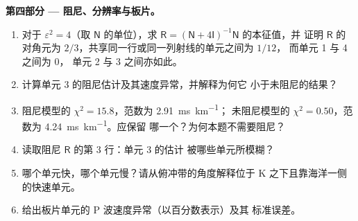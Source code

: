 \begin{problem}
\noindent\textbf{第四部分 --- 阻尼、分辨率与板片。}
\begin{enumerate}[resume]
  \item 对于 $\varepsilon^2 = 4$（取 $\mathsf N$ 的单位），求
        $\mathsf R = (\mathsf N + 4\mathsf I)^{-1}\mathsf N$ 的本征值，并
        证明 $\mathsf R$ 的对角元为 $2/3$，共享同一行或同一列射线的单元之间为 $1/12$，
        而单元 1 与 4 之间为 $0$，
        单元 2 与 3 之间亦如此。
  \item 计算单元 3 的阻尼估计及其速度异常，并解释为何它
        小于未阻尼的结果？
  \item 阻尼模型的 $\chi^2 = 15.8$，范数为 \qty{2.91}{ms.km^{-1}}；
        未阻尼模型的 $\chi^2 = 0.50$，范数为 \qty{4.24}{ms.km^{-1}}。应保留
        哪一个？为何本题不需要阻尼？
  \item 读取阻尼 $\mathsf R$ 的第 3 行：单元 3 的估计
        被哪些单元所模糊？
  \item 哪个单元快，哪个单元慢？请从俯冲带的角度解释位于
        K 之下且靠海洋一侧的快速单元。
  \item 给出板片单元的 P 波速度异常（以百分数表示）及其
        标准误差。
\end{enumerate}
\end{problem}
